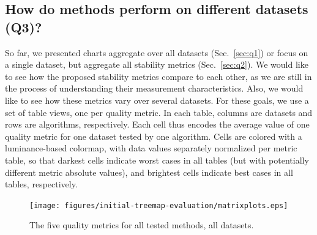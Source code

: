 \subsection{How do methods perform on different datasets (Q3)?}
\label{sec:q3}
%
%
So far, we presented charts aggregate over all datasets (Sec.~\ref{sec:q1}) or focus on a single dataset, but aggregate all stability metrics (Sec.~\ref{sec:q2}). We would like to see how the proposed stability metrics compare to each other, as we are still in the process of understanding their measurement characteristics. Also, we would like to see how these metrics vary over several datasets. For these goals, we use a set of table views, one per quality metric. In each table, columns are datasets and rows are algorithms, respectively. Each cell thus encodes the average value of one quality metric for one dataset tested by one algorithm. Cells are colored with a luminance-based colormap, with data values separately normalized per metric table, so that darkest cells indicate worst cases in all tables (but with potentially different metric absolute values), and brightest cells indicate best cases in all tables, respectively.

\begin{figure}[htbp!]
\centering
  \texttt{[image: figures/initial-treemap-evaluation/matrixplots.eps]}
\vspace{-0.1cm}
    \caption{The five quality metrics for all tested methods, all datasets.}
\vspace{-0.2cm}
  \label{fig:table}
\end{figure}

